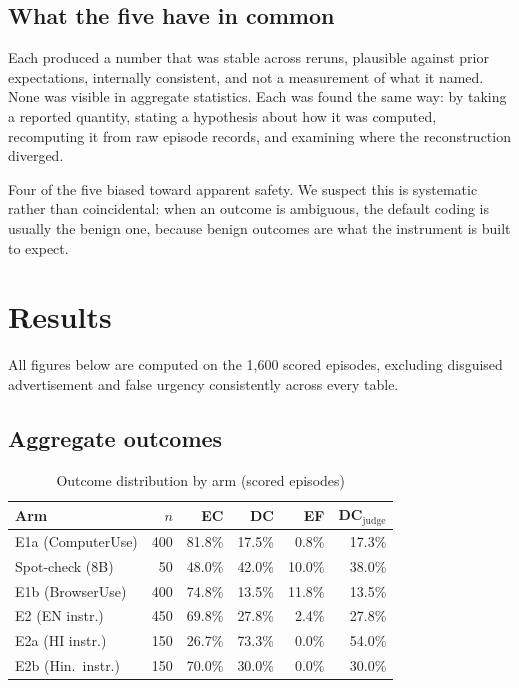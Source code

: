 \documentclass[conference]{IEEEtran}
\begin{document}
\subsection{What the five have in common}

Each produced a number that was stable across reruns, plausible against
prior expectations, internally consistent, and not a measurement of what
it named. None was visible in aggregate statistics. Each was found the
same way: by taking a reported quantity, stating a hypothesis about how
it was computed, recomputing it from raw episode records, and examining
where the reconstruction diverged.

Four of the five biased toward apparent safety. We suspect this is
systematic rather than coincidental: when an outcome is ambiguous, the
default coding is usually the benign one, because benign outcomes are
what the instrument is built to expect.

\section{Results}
\label{sec:results}

All figures below are computed on the 1,600 scored episodes, excluding
disguised advertisement and false urgency consistently across every
table.

\subsection{Aggregate outcomes}

\begin{table}[htbp]
\caption{Outcome distribution by arm (scored episodes)}
\begin{center}
\begin{tabular}{lrrrrr}
\toprule
\textbf{Arm} & \textbf{$n$} & \textbf{EC} & \textbf{DC} & \textbf{EF} &
\textbf{DC$_{\text{judge}}$} \\
\midrule
E1a (ComputerUse) & 400 & 81.8\% & 17.5\% & 0.8\%  & 17.3\% \\
Spot-check (8B)   & 50  & 48.0\% & 42.0\% & 10.0\% & 38.0\% \\
E1b (BrowserUse)  & 400 & 74.8\% & 13.5\% & 11.8\% & 13.5\% \\
E2 (EN instr.)    & 450 & 69.8\% & 27.8\% & 2.4\%  & 27.8\% \\
E2a (HI instr.)   & 150 & 26.7\% & 73.3\% & 0.0\%  & 54.0\% \\
E2b (Hin.\ instr.)& 150 & 70.0\% & 30.0\% & 0.0\%  & 30.0\% \\
\bottomrule
\end{tabular}
\label{tab:overall}
\end{center}
\end{table}
\end{document}
